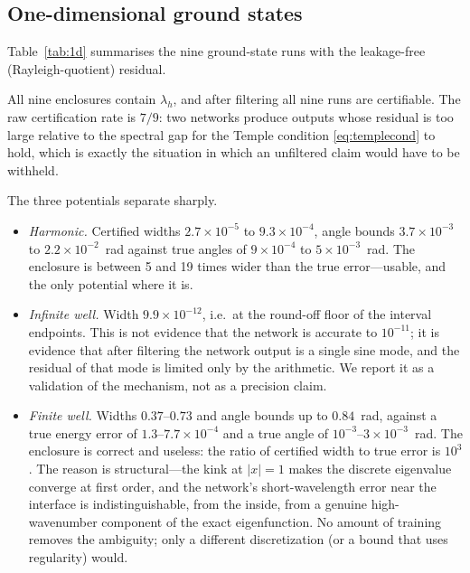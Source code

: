 \subsection{One-dimensional ground states}
\label{sec:1d}

Table~\ref{tab:1d} summarises the nine ground-state runs with the
leakage-free (Rayleigh-quotient) residual.

\begin{table}[t]
\centering
\small

\caption{One-dimensional ground states, three seeds per potential, 2001-point
grid, $10^4$ epochs. ``raw cert.'' is the number of seeds for which the
unfiltered network output is certifiable. Widths and angle bounds are from the
filtered certificate; ``contains'' counts the enclosures that contain the
independently computed $\lambda_h$.}
\label{tab:1d}
\end{table}

All nine enclosures contain $\lambda_h$, and after filtering all nine runs are
certifiable. The raw certification rate is $7/9$: two networks produce
outputs whose residual is too large relative to the spectral gap for the
Temple condition \eqref{eq:templecond} to hold, which is exactly the situation
in which an unfiltered claim would have to be withheld.

The three potentials separate sharply.
\begin{itemize}
\item \emph{Harmonic.} Certified widths $2.7\times10^{-5}$ to
  $9.3\times10^{-4}$, angle bounds $3.7\times10^{-3}$ to
  $2.2\times10^{-2}$~rad against true angles of $9\times10^{-4}$ to
  $5\times10^{-3}$~rad. The
  enclosure is between 5 and 19 times wider than the true error---usable, and
  the only potential where it is.
\item \emph{Infinite well.} Width $9.9\times10^{-12}$, i.e.\ at the
  round-off floor of the interval endpoints. This is not evidence that the
  network is accurate to $10^{-11}$; it is evidence that after filtering the
  network output is a single sine mode, and the residual of that mode is
  limited only by the arithmetic. We report it as a validation of the
  mechanism, not as a precision claim.
\item \emph{Finite well.} Widths $0.37$--$0.73$ and angle bounds up to
  $0.84$~rad, against a true energy error of $1.3$--$7.7\times10^{-4}$ and a
  true angle of $10^{-3}$--$3\times10^{-3}$~rad. The enclosure is correct and
  useless: the ratio of certified width to true error is $10^{3}$. The reason is structural---the kink at
  $|x|=1$ makes the discrete eigenvalue converge at first order, and the
  network's short-wavelength error near the interface is indistinguishable,
  from the inside, from a genuine high-wavenumber component of the exact
  eigenfunction. No amount of training removes the ambiguity; only a
  different discretization (or a bound that uses regularity) would.
\end{itemize}


